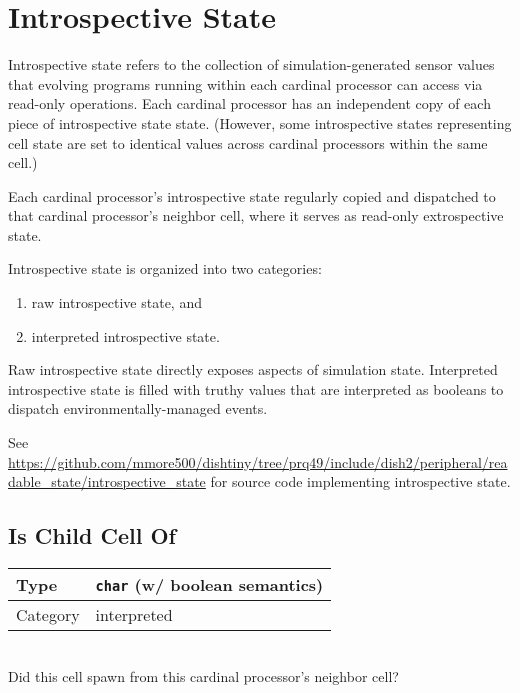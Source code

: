\newcommand{\instrospectivestatedef}[2]{
    \begin{tabular}{|
        >{\columncolor[HTML]{C0C0C0}}l |l|}
        \hline
        Type & #1 \\ \hline
        Category & #2 \\ \hline
    \end{tabular} \\
}

\section{Introspective State}

Introspective state refers to the collection of simulation-generated sensor values that evolving programs running within each cardinal processor can access via read-only operations.
Each cardinal processor has an independent copy of each piece of introspective state state.
(However, some introspective states representing cell state are set to identical values across cardinal processors within the same cell.)

Each cardinal processor's introspective state regularly copied and dispatched to that cardinal processor's neighbor cell, where it serves as read-only extrospective state.

Introspective state is organized into two categories:
\begin{enumerate}
    \item raw introspective state, and
    \item interpreted introspective state.
\end{enumerate}

Raw introspective state directly exposes aspects of simulation state.
Interpreted introspective state is filled with truthy values that are interpreted as booleans to dispatch environmentally-managed events.

See \url{https://github.com/mmore500/dishtiny/tree/prq49/include/dish2/peripheral/readable_state/introspective_state} for source code implementing introspective state.

\subsection{Is Child Cell Of}

\instrospectivestatedef{\texttt{char} (w/ boolean semantics)}{interpreted}

Did this cell spawn from this cardinal processor's neighbor cell?

